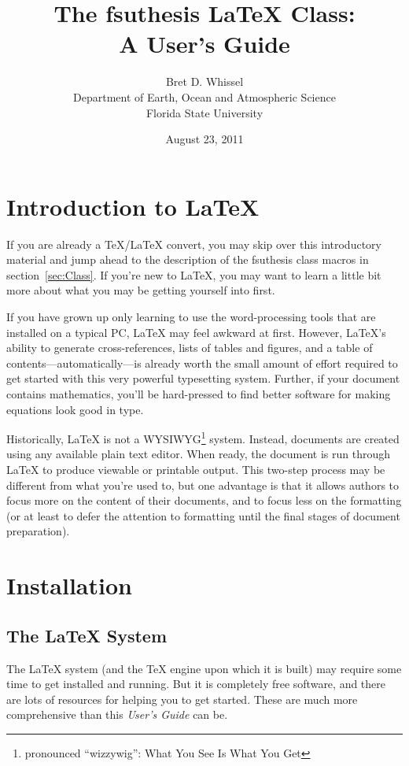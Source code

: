 \documentclass[11pt,letterpaper]{article}
\title{The \textsf{fsuthesis} \LaTeX{} Class:\\
  A User's Guide}
\author{Bret D. Whissel\\Department of Earth, Ocean and Atmospheric
  Science\\Florida State University}
\date{August 23, 2011}
\newcommand*{\acro}[1]{{\small\textsc{#1}}}
\newcommand*{\booktitle}[1]{\textit{#1}}
\newcommand*{\latexclass}[1]{\textsf{#1}}
\newcommand*{\fsuth}{\latexclass{fsuthesis}}
\renewcommand{\-}{\discretionary{}{}{}}
\begin{document}
\maketitle

\tableofcontents

\section{Introduction to \LaTeX}

If you are already a \TeX/\LaTeX{} convert, you may skip over this
introductory material and jump ahead to the description of the
\fsuth{} class macros in section~\ref{sec:Class}.  If you're new to
\LaTeX, you may want to learn a little bit more about what you may be
getting yourself into first.

If you have grown up only learning to use the word-processing tools
that are installed on a typical PC, \LaTeX{} may feel awkward at
first.  However, \LaTeX's ability to generate cross-references, lists
of tables and figures, and a table of contents---automatically---is
already worth the small amount of effort required to get started with
this very powerful typesetting system.  Further, if your document
contains mathematics, you'll be hard-pressed to find better software
for making equations look good in type.

Historically, \LaTeX{} is not a \acro{WYSIWYG}\footnote{pronounced
  ``wizzywig'': What You See Is What You Get} system.  Instead,
documents are created using any available plain text editor.  When
ready, the document is run through \LaTeX{} to produce viewable or
printable output.  This two-step process may be different from what
you're used to, but one advantage is that it allows authors to focus
more on the content of their documents, and to focus less on the
formatting (or at least to defer the attention to formatting until the
final stages of document preparation).

\section{Installation}

\subsection{The \LaTeX{} System}

The \LaTeX{} system (and the \TeX{} engine upon which it is built) may
require some time to get installed and running.  But it is completely
free software, and there are lots of resources for helping you to get
started.  These are much more comprehensive than this
\booktitle{User's Guide} can be.
\end{document}
